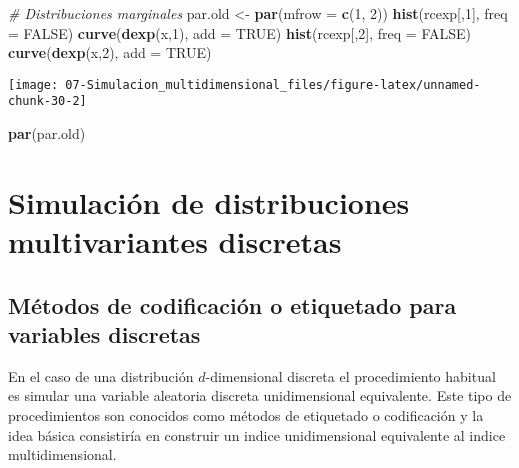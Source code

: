 \documentclass[
]{book}
\newenvironment{Shaded}{\begin{snugshade}}{\end{snugshade}}
\newcommand{\CommentTok}[1]{\textcolor[rgb]{0.56,0.35,0.01}{\textit{#1}}}
\newcommand{\DataTypeTok}[1]{\textcolor[rgb]{0.13,0.29,0.53}{#1}}
\newcommand{\DecValTok}[1]{\textcolor[rgb]{0.00,0.00,0.81}{#1}}
\newcommand{\KeywordTok}[1]{\textcolor[rgb]{0.13,0.29,0.53}{\textbf{#1}}}
\newcommand{\NormalTok}[1]{#1}
\newcommand{\OtherTok}[1]{\textcolor[rgb]{0.56,0.35,0.01}{#1}}
\newcommand{\StringTok}[1]{\textcolor[rgb]{0.31,0.60,0.02}{#1}}
\theoremstyle{break}
\theoremstyle{definition}
\theoremstyle{definition}
\theoremstyle{definition}
\theoremstyle{remark}
\begin{document}
\begin{enumerate}
\begin{Shaded}
\begin{Highlighting}[]
\CommentTok{# Distribuciones marginales}
\NormalTok{par.old <-}\StringTok{ }\KeywordTok{par}\NormalTok{(}\DataTypeTok{mfrow =} \KeywordTok{c}\NormalTok{(}\DecValTok{1}\NormalTok{, }\DecValTok{2}\NormalTok{))}
\KeywordTok{hist}\NormalTok{(rcexp[,}\DecValTok{1}\NormalTok{], }\DataTypeTok{freq =} \OtherTok{FALSE}\NormalTok{)}
\KeywordTok{curve}\NormalTok{(}\KeywordTok{dexp}\NormalTok{(x,}\DecValTok{1}\NormalTok{), }\DataTypeTok{add =} \OtherTok{TRUE}\NormalTok{)}
\KeywordTok{hist}\NormalTok{(rcexp[,}\DecValTok{2}\NormalTok{], }\DataTypeTok{freq =} \OtherTok{FALSE}\NormalTok{)}
\KeywordTok{curve}\NormalTok{(}\KeywordTok{dexp}\NormalTok{(x,}\DecValTok{2}\NormalTok{), }\DataTypeTok{add =} \OtherTok{TRUE}\NormalTok{)}
\end{Highlighting}
\end{Shaded}

  \begin{center}\texttt{[image: 07-Simulacion\_multidimensional\_files/figure-latex/unnamed-chunk-30-2]} \end{center}

\begin{Shaded}
\begin{Highlighting}[]
\KeywordTok{par}\NormalTok{(par.old)}
\end{Highlighting}
\end{Shaded}
\end{enumerate}

\hypertarget{mult-discr}{%
\section{Simulación de distribuciones multivariantes discretas}\label{mult-discr}}

\hypertarget{muxe9todos-de-codificaciuxf3n-o-etiquetado-para-variables-discretas}{%
\subsection{Métodos de codificación o etiquetado para variables discretas}\label{muxe9todos-de-codificaciuxf3n-o-etiquetado-para-variables-discretas}}

En el caso de una distribución \(d\)-dimensional discreta
el procedimiento habitual es simular una variable aleatoria discreta
unidimensional equivalente.
Este tipo de procedimientos son conocidos como métodos de etiquetado o
codificación y la idea básica consistiría en construir un
indice unidimensional equivalente al indice multidimensional.
\end{document}
